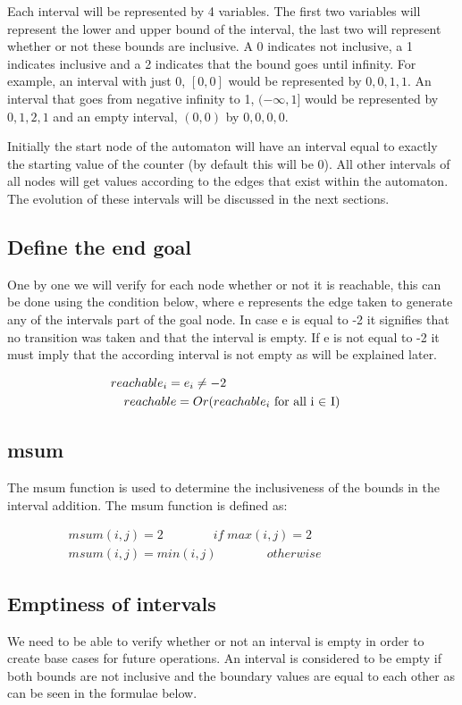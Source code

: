 \documentclass[12pt]{thesis}
\begin{document}
Each interval will be represented by 4 variables. The first two variables will represent the lower and upper bound of the interval, the last two will represent whether or not these bounds are inclusive. A 0 indicates not inclusive, a 1 indicates inclusive and a 2 indicates that the bound goes until infinity. For example, an interval with just 0, $[0, 0]$ would be represented by $0, 0, 1, 1$. An interval that goes from negative infinity to 1, $(-\infty, 1]$ would be represented by $0, 1, 2, 1$ and an empty interval, $(0, 0)$ by $0, 0, 0, 0$.

Initially the start node of the automaton will have an interval equal to exactly the starting value of the counter (by default this will be 0). All other intervals of all nodes will get values according to the edges that exist within the automaton. The evolution of these intervals will be discussed in the next sections.

\subsection{Define the end goal}
One by one we will verify for each node whether or not it is reachable, this can be done using the condition below, where e represents the edge taken to generate any of the intervals part of the goal node. In case e is equal to -2 it signifies that no transition was taken and that the interval is empty. If e is not equal to -2 it must imply that the according interval is not empty as will be explained later.

\begin{gather*}
	\hspace{-102 pt}reachable_i = e_i \ne -2 \\
	reachable = Or(reachable_i \text{ for all i $\in$ I})
\end{gather*}

\subsection{msum}
The msum function is used to determine the inclusiveness of the bounds in the interval addition. The msum function is defined as:

\begin{gather*}
msum(i, j) = 2 \qquad \qquad if \; max(i,j) = 2 \\
msum(i, j) = min(i, j) \quad \qquad \quad otherwise \qquad \qquad \qquad
\end{gather*}

\subsection{Emptiness of intervals}
We need to be able to verify whether or not an interval is empty in order to create base cases for future operations. An interval is considered to be empty if both bounds are not inclusive and the boundary values are equal to each other as can be seen in the formulae below. 
\end{document}
